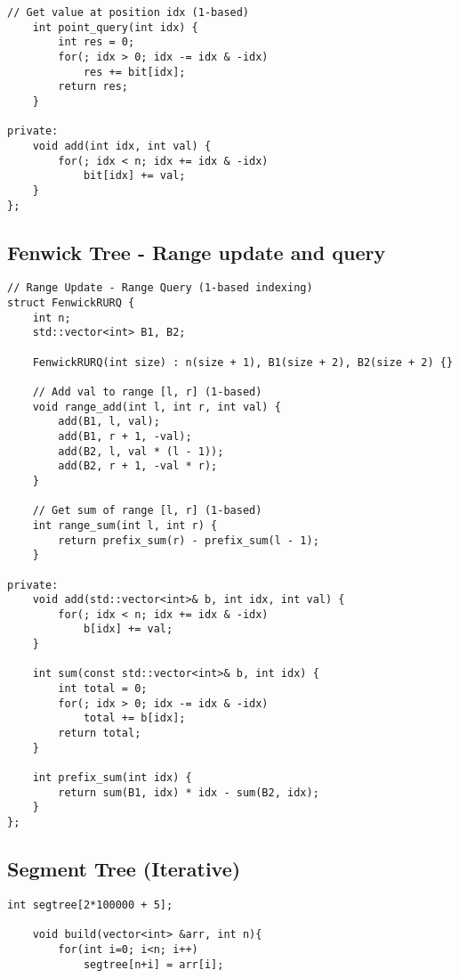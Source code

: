 \documentclass[10pt]{article}
\begin{document}
\begin{multicols*}{2}
\begin{lstlisting}[style=compactcpp]
    // Get value at position idx (1-based)
    int point_query(int idx) {
        int res = 0;
        for(; idx > 0; idx -= idx & -idx)
            res += bit[idx];
        return res;
    }

private:
    void add(int idx, int val) {
        for(; idx < n; idx += idx & -idx)
            bit[idx] += val;
    }
};
\end{lstlisting}

\subsection{Fenwick Tree - Range update and query}

\begin{lstlisting}[style=compactcpp]
// Range Update - Range Query (1-based indexing)
struct FenwickRURQ {
    int n;
    std::vector<int> B1, B2;
    
    FenwickRURQ(int size) : n(size + 1), B1(size + 2), B2(size + 2) {}
    
    // Add val to range [l, r] (1-based)
    void range_add(int l, int r, int val) {
        add(B1, l, val);
        add(B1, r + 1, -val);
        add(B2, l, val * (l - 1));
        add(B2, r + 1, -val * r);
    }
    
    // Get sum of range [l, r] (1-based)
    int range_sum(int l, int r) {
        return prefix_sum(r) - prefix_sum(l - 1);
    }

private:
    void add(std::vector<int>& b, int idx, int val) {
        for(; idx < n; idx += idx & -idx)
            b[idx] += val;
    }
    
    int sum(const std::vector<int>& b, int idx) {
        int total = 0;
        for(; idx > 0; idx -= idx & -idx)
            total += b[idx];
        return total;
    }
    
    int prefix_sum(int idx) {
        return sum(B1, idx) * idx - sum(B2, idx);
    }
};
\end{lstlisting}

\subsection{Segment Tree (Iterative)}

\begin{lstlisting}[style=compactcpp]
int segtree[2*100000 + 5];

    void build(vector<int> &arr, int n){
        for(int i=0; i<n; i++)
            segtree[n+i] = arr[i];
        

\end{lstlisting}
\end{multicols*}
\end{document}
